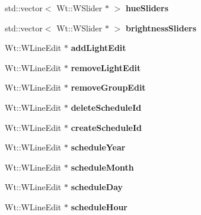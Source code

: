 \begin{DoxyCompactItemize}
std\+::vector$<$ Wt\+::\+W\+Slider $\ast$ $>$ {\bfseries hue\+Sliders}
\item 
\mbox{\label{class_home_page_a806a9da2d7a0aecb97e044ae400612c0}} 
std\+::vector$<$ Wt\+::\+W\+Slider $\ast$ $>$ {\bfseries brightness\+Sliders}
\item 
\mbox{\label{class_home_page_a7d0dd7b2b4bde6726d93d04b88eba8ec}} 
Wt\+::\+W\+Line\+Edit $\ast$ {\bfseries add\+Light\+Edit}
\item 
\mbox{\label{class_home_page_a1992b94e871aa02620cd3f3344742978}} 
Wt\+::\+W\+Line\+Edit $\ast$ {\bfseries remove\+Light\+Edit}
\item 
\mbox{\label{class_home_page_aa923822ce73ff50a6ac80e75ecc34558}} 
Wt\+::\+W\+Line\+Edit $\ast$ {\bfseries remove\+Group\+Edit}
\item 
\mbox{\label{class_home_page_af0975aebdc40be8d3bb10a4cc0f330b2}} 
Wt\+::\+W\+Line\+Edit $\ast$ {\bfseries delete\+Schedule\+Id}
\item 
\mbox{\label{class_home_page_a863788b73e47f8568bcf34dce9b3a254}} 
Wt\+::\+W\+Line\+Edit $\ast$ {\bfseries create\+Schedule\+Id}
\item 
\mbox{\label{class_home_page_a82efb549e93697236e4b78e7b3e9ee40}} 
Wt\+::\+W\+Line\+Edit $\ast$ {\bfseries schedule\+Year}
\item 
\mbox{\label{class_home_page_aba574ecf94395d37f557d721e1c76413}} 
Wt\+::\+W\+Line\+Edit $\ast$ {\bfseries schedule\+Month}
\item 
\mbox{\label{class_home_page_a320665647585bf13dc9cf9a5027f3833}} 
Wt\+::\+W\+Line\+Edit $\ast$ {\bfseries schedule\+Day}
\item 
\mbox{\label{class_home_page_a88fc775a2870d436b3ff0c1e08cb7c47}} 
Wt\+::\+W\+Line\+Edit $\ast$ {\bfseries schedule\+Hour}
\item 
\mbox{\label{class_home_page_a7707bae4d9c88faae9180c635890a6a8}} 

\end{DoxyCompactItemize}
